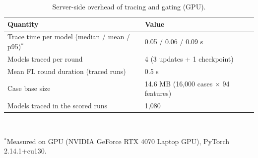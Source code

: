 \begin{table}[!t]
\centering
\caption{Server-side overhead of tracing and gating (GPU).}
\label{tab:overhead}
\footnotesize
\setlength{\tabcolsep}{4pt}
\begin{tabular}{@{}ll@{}}
\toprule
\textbf{Quantity} & \textbf{Value} \\
\midrule
Trace time per model (median / mean / p95)$^\ast$ & 0.05 / 0.06 / 0.09 s \\
Models traced per round & 4 (3 updates + 1 checkpoint) \\
Mean FL round duration (traced runs) & 0.5 s \\
Case base size & 14.6 MB (16{,}000 cases $\times$ 94 features) \\
Models traced in the scored runs & 1{,}080 \\
\bottomrule
\end{tabular}
\\[2pt]
\parbox{\columnwidth}{\scriptsize $^\ast$Measured on GPU (NVIDIA GeForce RTX 4070 Laptop GPU), PyTorch 2.14.1+cu130.}
\end{table}
